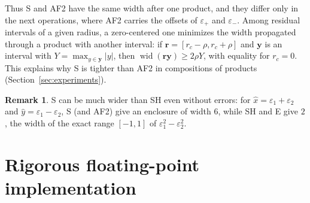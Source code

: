 \documentclass[10pt]{article}
\theoremstyle{definition}
\newtheorem{remark}[theorem]{Remark}
\newcommand{\eps}{\varepsilon}
\newcommand{\wid}{\operatorname{wid}}
\begin{document}
Thus S and AF2 have the same width after one product, and they differ only in the next operations, where AF2 carries the offsets of $\eps_+$ and $\eps_-$. Among residual intervals of a given radius, a zero-centered one minimizes the width propagated through a product with another interval: if $\mathbf r=[r_c-\rho,r_c+\rho]$ and $\mathbf y$ is an interval with $Y=\max_{y\in\mathbf y}|y|$, then $\wid(\mathbf r\mathbf y)\ge 2\rho Y$, with equality for $r_c=0$. This explains why S is tighter than AF2 in compositions of products (Section~\ref{sec:experiments}).

\begin{remark}
S can be much wider than SH even without errors: for $\hat x=\eps_1+\eps_2$ and $\hat y=\eps_1-\eps_2$, S (and AF2) give an enclosure of width $6$, while SH and E give $2$, the width of the exact range $[-1,1]$ of $\eps_1^2-\eps_2^2$.
\end{remark}

\section{Rigorous floating-point implementation}
\label{sec:rigor}
\end{document}
